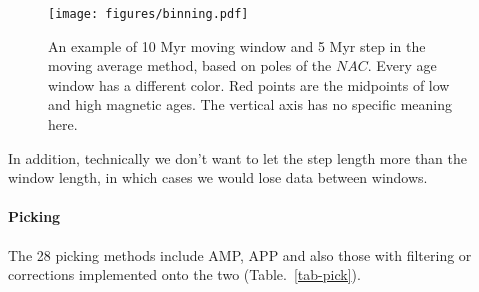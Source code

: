 \begin{figure*}
\centering
\texttt{[image: figures/binning.pdf]}
\caption[Moving average (MA) methods]{An example of 10 Myr moving window and 5
Myr step in the moving average method, based on poles of the $NAC$. Every age
window has a different color. Red points are the midpoints of low and high
magnetic ages. The vertical axis has no specific meaning here.
}\label{fig-nac-maplat}
\end{figure*}

In addition, technically we don't want to let the step length more than the
window length, in which cases we would lose data between windows.

\paragraph{Picking}

The 28 picking methods include AMP, APP and also those with filtering or
corrections implemented onto the two (Table.~\ref{tab-pick}).

